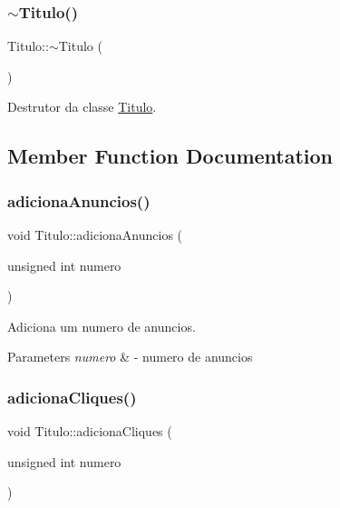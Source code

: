 \subsubsection{\texorpdfstring{$\sim$\+Titulo()}{~Titulo()}}
{\footnotesize\ttfamily Titulo\+::$\sim$\+Titulo (\begin{DoxyParamCaption}{ }\end{DoxyParamCaption})\hspace{0.3cm}{\ttfamily [virtual]}}



Destrutor da classe \mbox{\hyperlink{class_titulo}{Titulo}}. 



\subsection{Member Function Documentation}
\mbox{\label{class_titulo_a8004d12b8ae0d0746b999a6411df150c}} 
\subsubsection{\texorpdfstring{adiciona\+Anuncios()}{adicionaAnuncios()}}
{\footnotesize\ttfamily void Titulo\+::adiciona\+Anuncios (\begin{DoxyParamCaption}\item[{unsigned int}]{numero }\end{DoxyParamCaption})}



Adiciona um numero de anuncios. 


\begin{DoxyParams}{Parameters}
{\em numero} & -\/ numero de anuncios \\
\hline
\end{DoxyParams}
\mbox{\label{class_titulo_a0cf99e4a2b522a7acae425593e87efec}} 
\subsubsection{\texorpdfstring{adiciona\+Cliques()}{adicionaCliques()}}
{\footnotesize\ttfamily void Titulo\+::adiciona\+Cliques (\begin{DoxyParamCaption}\item[{unsigned int}]{numero }\end{DoxyParamCaption})}



